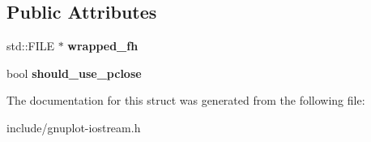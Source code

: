 \subsection*{Public Attributes}
\begin{DoxyCompactItemize}
\item 
\mbox{\label{structgnuplotio_1_1FileHandleWrapper_adcb58bfcd9dbdba000a7e7395bee2ef9}} 
std\+::\+F\+I\+LE $\ast$ {\bfseries wrapped\+\_\+fh}
\item 
\mbox{\label{structgnuplotio_1_1FileHandleWrapper_a11b63ed64cf53167e26c5273778d90ea}} 
bool {\bfseries should\+\_\+use\+\_\+pclose}
\end{DoxyCompactItemize}


The documentation for this struct was generated from the following file\+:\begin{DoxyCompactItemize}
\item 
include/gnuplot-\/iostream.\+h\end{DoxyCompactItemize}
